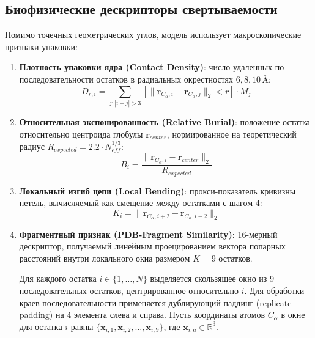 \documentclass[12pt, a4paper]{article}
\begin{document}
\subsection{Биофизические дескрипторы свертываемости}
Помимо точечных геометрических углов, модель использует макроскопические признаки упаковки:
\begin{enumerate}
    \item \textbf{Плотность упаковки ядра (Contact Density)}: число удаленных по последовательности остатков в радиальных окрестностях $6, 8, 10\,\text{\AA}$:
    \begin{equation}
        D_{r, i} = \sum_{j: |i-j| > 3} [\|\mathbf{r}_{C_\alpha, i} - \mathbf{r}_{C_\alpha, j}\|_2 < r] \cdot M_j
    \end{equation}
    \item \textbf{Относительная экспонированность (Relative Burial)}: положение остатка относительно центроида глобулы $\mathbf{r}_{center}$, нормированное на теоретический радиус $R_{expected} = 2.2 \cdot N_{eff}^{1/3}$:
    \begin{equation}
        B_i = \frac{\|\mathbf{r}_{C_\alpha, i} - \mathbf{r}_{center}\|_2}{R_{expected}}
    \end{equation}
    \item \textbf{Локальный изгиб цепи (Local Bending)}: прокси-показатель кривизны петель, вычисляемый как смещение между остатками с шагом 4:
    \begin{equation}
        K_i = \|\mathbf{r}_{C_\alpha, i+2} - \mathbf{r}_{C_\alpha, i-2}\|_2
    \end{equation}
    \item \textbf{Фрагментный признак (PDB-Fragment Similarity)}: 16-мерный дескриптор, получаемый линейным проецированием вектора попарных расстояний внутри локального окна размером $K=9$ остатков.
    
    Для каждого остатка $i \in \{1, \dots, N\}$ выделяется скользящее окно из 9 последовательных остатков, центрированное относительно $i$. Для обработки краев последовательности применяется дублирующий паддинг (replicate padding) на 4 элемента слева и справа. Пусть координаты атомов $C_\alpha$ в окне для остатка $i$ равны $\{\mathbf{x}_{i, 1}, \mathbf{x}_{i, 2}, \dots, \mathbf{x}_{i, 9}\}$, где $\mathbf{x}_{i, a} \in \mathbb{R}^3$.
    

\end{enumerate}
\end{document}
